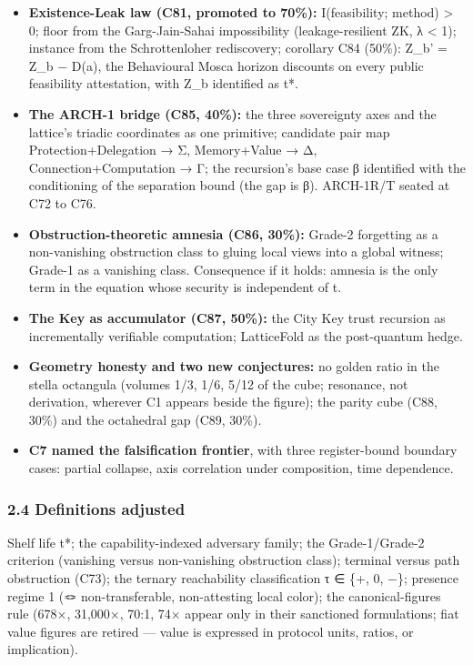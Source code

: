 \documentclass[
  11pt,
]{article}
\providecommand{\tightlist}{%
  \setlength{\itemsep}{0pt}\setlength{\parskip}{0pt}}
\begin{document}
\begin{itemize}
\tightlist
\item
  \textbf{Existence-Leak law (C81, promoted to 70\%):} I(feasibility;
  method) \textgreater{} 0; floor from the Garg-Jain-Sahai impossibility
  (leakage-resilient ZK, λ \textless{} 1); instance from the
  Schrottenloher rediscovery; corollary C84 (50\%): Z\_b' = Z\_b − D(a),
  the Behavioural Mosca horizon discounts on every public feasibility
  attestation, with Z\_b identified as t*.
\item
  \textbf{The ARCH-1 bridge (C85, 40\%):} the three sovereignty axes and
  the lattice's triadic coordinates as one primitive; candidate pair map
  Protection+Delegation → Σ, Memory+Value → Δ, Connection+Computation →
  Γ; the recursion's base case β identified with the conditioning of the
  separation bound (the gap is β). ARCH-1R/T seated at C72 to C76.
\item
  \textbf{Obstruction-theoretic amnesia (C86, 30\%):} Grade-2 forgetting
  as a non-vanishing obstruction class to gluing local views into a
  global witness; Grade-1 as a vanishing class. Consequence if it holds:
  amnesia is the only term in the equation whose security is independent
  of t.
\item
  \textbf{The Key as accumulator (C87, 50\%):} the City Key trust
  recursion as incrementally verifiable computation; LatticeFold as the
  post-quantum hedge.
\item
  \textbf{Geometry honesty and two new conjectures:} no golden ratio in
  the stella octangula (volumes 1/3, 1/6, 5/12 of the cube; resonance,
  not derivation, wherever C1 appears beside the figure); the parity
  cube (C88, 30\%) and the octahedral gap (C89, 30\%).
\item
  \textbf{C7 named the falsification frontier}, with three
  register-bound boundary cases: partial collapse, axis correlation
  under composition, time dependence.
\end{itemize}

\subsubsection{2.4 Definitions adjusted}\label{definitions-adjusted}

Shelf life t*; the capability-indexed adversary family; the
Grade-1/Grade-2 criterion (vanishing versus non-vanishing obstruction
class); terminal versus path obstruction (C73); the ternary reachability
classification τ ∈ \{+, 0, −\}; presence regime 1 (🪢 non-transferable,
non-attesting local color); the canonical-figures rule (678×, 31,000×,
70:1, 74× appear only in their sanctioned formulations; fiat value
figures are retired --- value is expressed in protocol units, ratios, or
implication).
\end{document}
